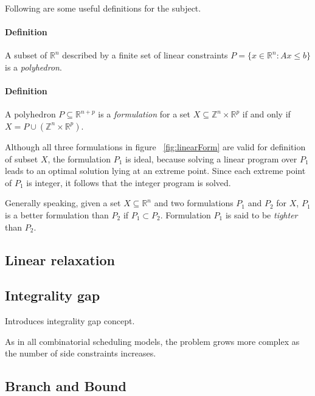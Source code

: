 Following are some useful definitions for the subject.

\paragraph{Definition}
A subset of $\mathbb{R}^{n}$ described by a finite set of linear constraints $P=\{x \in \mathbb{R}^{n}: Ax \le b\}$ is a \textit{polyhedron}.

\paragraph{Definition}
A polyhedron $P \subseteq \mathbb{R}^{n+p}$ is a \textit{formulation} for a set $X \subseteq \mathbb{Z}^{n} \times \mathbb{R}^{p}$ if and only if $X = P \cup (\mathbb{Z}^{n} \times \mathbb{R}^{p})$.

\vspace{7 mm}

Although all three formulations in figure ~\ref{fig:linearForm} are valid for definition of subset $X$, the formulation $P_{1}$ is ideal, because solving a linear program over $P_{1}$ leads to an optimal solution lying at an extreme point. Since each extreme point of $P_{1}$ is integer, it follows that the integer program is solved.

Generally speaking, given a set $X \subseteq \mathbb{R}^n$ and two formulations $P_{1}$ and $P_{2}$ for $X$, $P_{1}$ is a better formulation than $P_{2}$ if $P_{1} \subset P_{2}$. Formulation $P_{1}$ is said to be \textit{tighter} than $P_{2}$.



\subsection{Linear relaxation}




\subsection{Integrality gap}

Introduces integrality gap concept.

As in all combinatorial scheduling models, the problem grows more complex as the number of side constraints increases.


\subsection{Branch and Bound}

